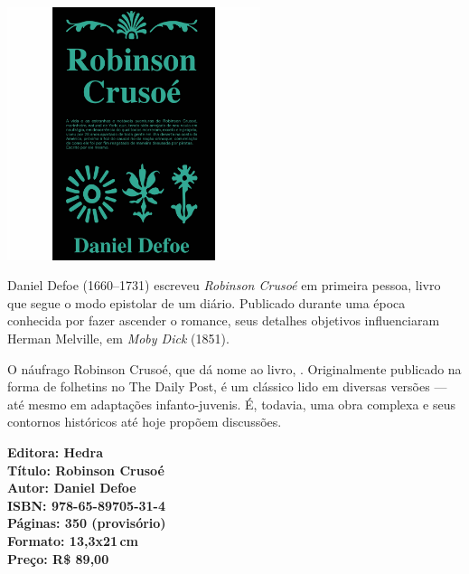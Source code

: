 \begin{center}
\hspace*{.5cm}\includegraphics[width=74mm]{./CAPAS/HEDRA_ROBINSON.jpg}
\end{center}
\hspace*{-7cm}\hrulefill\hspace*{-7cm}
\medskip

\noindent{}Daniel Defoe (1660--1731) escreveu \textit{Robinson Crusoé} em primeira pessoa, livro que segue o modo epistolar de um diário. Publicado durante uma época conhecida por fazer ascender o romance, seus detalhes objetivos influenciaram Herman Melville, em \textit{Moby Dick} (1851).

O náufrago Robinson Crusoé, que dá nome ao livro, . Originalmente publicado na forma de folhetins no The Daily Post, é um clássico lido em diversas versões --- até mesmo em adaptações infanto-juvenis. É, todavia, uma obra complexa e seus contornos históricos até hoje propõem discussões. 

\vfill
\noindent\begin{minipage}[c]{1\linewidth}
{\small\textbf{
\hspace*{-.1cm}Editora: Hedra\\
Título: Robinson Crusoé\\
Autor: Daniel Defoe\\ 
ISBN: 978-65-89705-31-4\\
Páginas: 350 (provisório)\\
Formato: 13,3x21\,cm\\
Preço: R\$ 89,00\\
}}
\end{minipage}
\pagebreak

